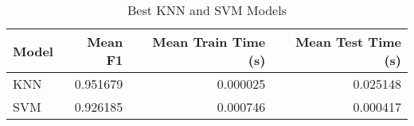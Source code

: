 \begin{table}
\centering
\caption{Best KNN and SVM Models}
\label{tab:best_knn_and_svm_summary_mushroom}
\begin{tabular}{lrrr}
\toprule
Model & Mean F1 & Mean Train Time (s) & Mean Test Time (s) \\
\midrule
KNN & 0.951679 & 0.000025 & 0.025148 \\
SVM & 0.926185 & 0.000746 & 0.000417 \\
\bottomrule
\end{tabular}
\end{table}
